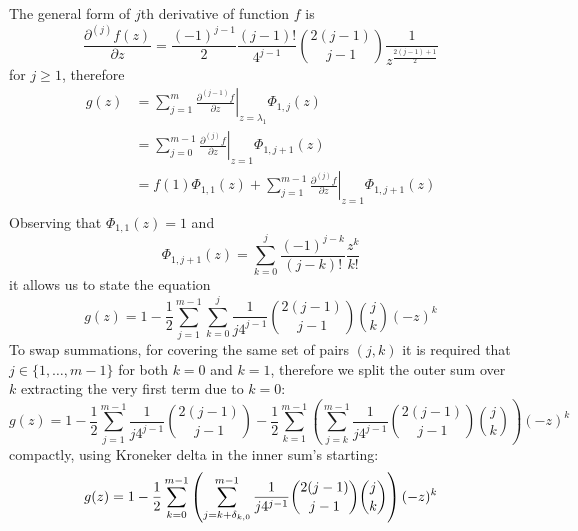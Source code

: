 The general form of $j$th derivative of function $f$ is 
$$\frac{\partial^{(j)}{f}(z)}{\partial{z}} =\frac{(-1)^{j-1}}{2}\frac{(j-1)!}{4^{j-1}}{{2(j-1)}\choose{j-1}}\frac{1}{z^{\frac{2(j-1)+1}{2}}} $$ 
for $j \geq 1$, therefore
\begin{displaymath}
\begin{split}
  g(z) &= \sum_{j=1}^{m}{ \left. \frac{\partial^{(j-1)}{f}}{\partial{z}} \right|_{z=\lambda_{1}}\Phi_{1,j}(z)} \\
       &= \sum_{j=0}^{m-1}{ \left. \frac{\partial^{(j)}{f}}{\partial{z}} \right|_{z=1}\Phi_{1,j+1}(z)} \\
       &= f(1)\Phi_{1,1}(z) + \sum_{j=1}^{m-1}{ \left. \frac{\partial^{(j)}{f}}{\partial{z}} \right|_{z=1}\Phi_{1,j+1}(z)} \\
\end{split}
\end{displaymath}
Observing that $\Phi_{1,1}(z)=1$ and
\begin{displaymath}
  \Phi_{1,j+1}(z) = \sum_{k=0}^{j}{\frac{(-1)^{j-k}}{(j-k)!}\frac{z^{k}}{k!}}
\end{displaymath}
it allows us to state the equation
\begin{equation}
  g(z) = 1 - \frac{1}{2} \sum_{j=1}^{m-1}{\sum_{k=0}^{j}{\frac{1}{j 4^{j-1}} {{2(j-1)}\choose{j-1}}{{j}\choose{k}} (-z)^{k}}}
\end{equation}
To swap summations, for covering the same set of pairs $(j, k)$ it is required that 
$j\in \lbrace 1, \ldots, m-1 \rbrace$ for both $k=0$ and $k=1$, therefore we split
the outer sum over $k$ extracting the very first term due to $k=0$:
\begin{equation}
  g(z) = 1 - \frac{1}{2}\sum_{j=1}^{m-1}{\frac{1}{j 4^{j-1}} {{2(j-1)}\choose{j-1}}} 
       - \frac{1}{2} \sum_{k=1}^{m-1}{\left(\sum_{j=k}^{m-1}{\frac{1}{j 4^{j-1}} {{2(j-1)}\choose{j-1}}{{j}\choose{k}}}\right)(-z)^{k}} 
\end{equation}
compactly, using Kroneker delta in the inner sum's starting:
\begin{equation}
  g(z) = 1 - \frac{1}{2} \sum_{k=0}^{m-1}{\left(\sum_{j=k+\delta_{k,0}}^{m-1}{\frac{1}{j 4^{j-1}} {{2(j-1)}\choose{j-1}}{{j}\choose{k}}}\right)(-z)^{k}} \\
\end{equation}


